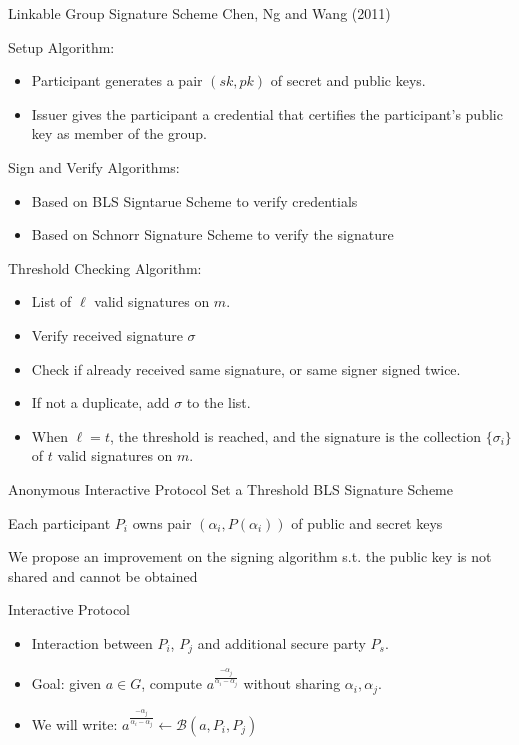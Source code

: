\begin{frame}{Linkable Group Signature Scheme}
Chen, Ng and Wang (2011)

Setup Algorithm:
\begin{itemize}
\item Participant generates a pair $(sk,pk)$ of secret and public keys.
\item Issuer gives the participant a credential that certifies the participant's public key as member of the group.
\end{itemize}

Sign and Verify Algorithms:
\begin{itemize}
\item Based on BLS Signtarue Scheme to verify credentials
\item Based on Schnorr Signature Scheme to verify the signature
\end{itemize}

\end{frame}

\begin{frame}
Threshold Checking Algorithm:
\begin{itemize}
\item List of $\ell$ valid signatures on $m$.
\item Verify received signature $\sigma$
\item Check if already received same signature, or same signer signed twice.
\item If not a duplicate, add $\sigma$ to the list.
\item When $\ell = t$, the threshold is reached, and the signature is the collection $\{\sigma_i\}$ of $t$ valid signatures on $m$.
\end{itemize}
\end{frame}

\begin{frame}{Anonymous Interactive Protocol}
Set a Threshold BLS Signature Scheme

Each participant $P_i$ owns pair $(\alpha_i, P(\alpha_i))$ of public and secret keys

We propose an improvement on the signing algorithm s.t. the public key is not shared and cannot be obtained

\end{frame}

\begin{frame}{Interactive Protocol}
\begin{itemize}
\item Interaction between $P_i$, $P_j$ and additional secure party $P_s$.
\item Goal: given $a \in G$, compute $a^{\frac{-\alpha_j}{\alpha_i-\alpha_j}}$ without sharing $\alpha_i, \alpha_j$.
\item We will write: $a^{\frac{-\alpha_j}{\alpha_i-\alpha_j}} \leftarrow \mathcal{B}(a,P_i,P_j)$
\end{itemize}
\end{frame}

